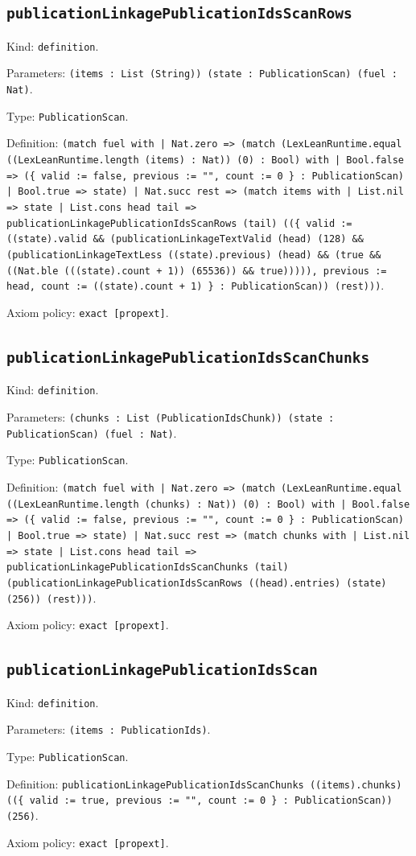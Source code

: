 \documentclass[11pt]{article}
\begin{document}
\subsection*{\texttt{publicationLinkagePublicationIdsScanRows}}
\noindent Kind: \texttt{definition}.\par
\noindent Parameters: \texttt{(items : List (String)) (state : PublicationScan) (fuel : Nat)}.\par
\noindent Type: \texttt{PublicationScan}.\par
\noindent Definition: \texttt{(match fuel with | Nat.zero => (match (LexLeanRuntime.equal ((LexLeanRuntime.length (items) : Nat)) (0) : Bool) with | Bool.false => (\{ valid := false, previous := "", count := 0 \} : PublicationScan) | Bool.true => state) | Nat.succ rest => (match items with | List.nil => state | List.cons head tail => publicationLinkagePublicationIdsScanRows (tail) ((\{ valid := ((state).valid \&\& (publicationLinkageTextValid (head) (128) \&\& (publicationLinkageTextLess ((state).previous) (head) \&\& (true \&\& ((Nat.ble (((state).count + 1)) (65536)) \&\& true))))), previous := head, count := ((state).count + 1) \} : PublicationScan)) (rest)))}.\par
\noindent Axiom policy: \texttt{exact [propext]}.\par
\subsection*{\texttt{publicationLinkagePublicationIdsScanChunks}}
\noindent Kind: \texttt{definition}.\par
\noindent Parameters: \texttt{(chunks : List (PublicationIdsChunk)) (state : PublicationScan) (fuel : Nat)}.\par
\noindent Type: \texttt{PublicationScan}.\par
\noindent Definition: \texttt{(match fuel with | Nat.zero => (match (LexLeanRuntime.equal ((LexLeanRuntime.length (chunks) : Nat)) (0) : Bool) with | Bool.false => (\{ valid := false, previous := "", count := 0 \} : PublicationScan) | Bool.true => state) | Nat.succ rest => (match chunks with | List.nil => state | List.cons head tail => publicationLinkagePublicationIdsScanChunks (tail) (publicationLinkagePublicationIdsScanRows ((head).entries) (state) (256)) (rest)))}.\par
\noindent Axiom policy: \texttt{exact [propext]}.\par
\subsection*{\texttt{publicationLinkagePublicationIdsScan}}
\noindent Kind: \texttt{definition}.\par
\noindent Parameters: \texttt{(items : PublicationIds)}.\par
\noindent Type: \texttt{PublicationScan}.\par
\noindent Definition: \texttt{publicationLinkagePublicationIdsScanChunks ((items).chunks) ((\{ valid := true, previous := "", count := 0 \} : PublicationScan)) (256)}.\par
\noindent Axiom policy: \texttt{exact [propext]}.\par
\end{document}
